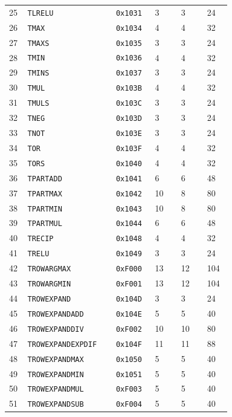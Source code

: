 {\begin{longtable}{@{}R{0.045\linewidth}L{0.29\linewidth}L{0.12\linewidth}R{0.10\linewidth}R{0.10\linewidth}R{0.08\linewidth}@{}}
25 & \texttt{TLRELU} & \texttt{0x1031} & 3 & 3 & 24 \\
26 & \texttt{TMAX} & \texttt{0x1034} & 4 & 4 & 32 \\
27 & \texttt{TMAXS} & \texttt{0x1035} & 3 & 3 & 24 \\
28 & \texttt{TMIN} & \texttt{0x1036} & 4 & 4 & 32 \\
29 & \texttt{TMINS} & \texttt{0x1037} & 3 & 3 & 24 \\
30 & \texttt{TMUL} & \texttt{0x103B} & 4 & 4 & 32 \\
31 & \texttt{TMULS} & \texttt{0x103C} & 3 & 3 & 24 \\
32 & \texttt{TNEG} & \texttt{0x103D} & 3 & 3 & 24 \\
33 & \texttt{TNOT} & \texttt{0x103E} & 3 & 3 & 24 \\
34 & \texttt{TOR} & \texttt{0x103F} & 4 & 4 & 32 \\
35 & \texttt{TORS} & \texttt{0x1040} & 4 & 4 & 32 \\
36 & \texttt{TPARTADD} & \texttt{0x1041} & 6 & 6 & 48 \\
37 & \texttt{TPARTMAX} & \texttt{0x1042} & 10 & 8 & 80 \\
38 & \texttt{TPARTMIN} & \texttt{0x1043} & 10 & 8 & 80 \\
39 & \texttt{TPARTMUL} & \texttt{0x1044} & 6 & 6 & 48 \\
40 & \texttt{TRECIP} & \texttt{0x1048} & 4 & 4 & 32 \\
41 & \texttt{TRELU} & \texttt{0x1049} & 3 & 3 & 24 \\
42 & \texttt{TROWARGMAX} & \texttt{0xF000} & 13 & 12 & 104 \\
43 & \texttt{TROWARGMIN} & \texttt{0xF001} & 13 & 12 & 104 \\
44 & \texttt{TROWEXPAND} & \texttt{0x104D} & 3 & 3 & 24 \\
45 & \texttt{TROWEXPANDADD} & \texttt{0x104E} & 5 & 5 & 40 \\
46 & \texttt{TROWEXPANDDIV} & \texttt{0xF002} & 10 & 10 & 80 \\
47 & \texttt{TROWEXPANDEXPDIF} & \texttt{0x104F} & 11 & 11 & 88 \\
48 & \texttt{TROWEXPANDMAX} & \texttt{0x1050} & 5 & 5 & 40 \\
49 & \texttt{TROWEXPANDMIN} & \texttt{0x1051} & 5 & 5 & 40 \\
50 & \texttt{TROWEXPANDMUL} & \texttt{0xF003} & 5 & 5 & 40 \\
51 & \texttt{TROWEXPANDSUB} & \texttt{0xF004} & 5 & 5 & 40 \\

\end{longtable}}
